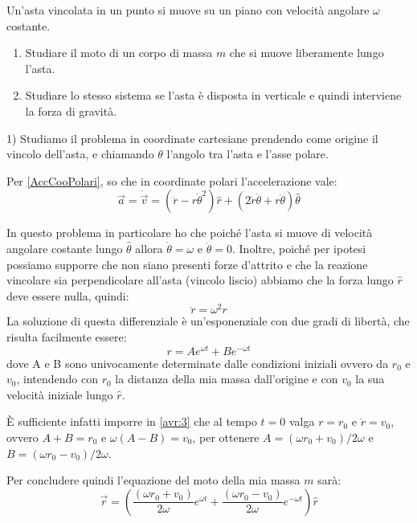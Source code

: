 \documentclass[../main.tex]{subfiles}
\begin{document}

\textex
Un'asta vincolata in un punto si muove su un piano con velocità angolare $\omega$ costante. 
\begin{enumerate}
	\item Studiare il moto di un corpo di massa $m$ che si muove liberamente lungo l'asta.
	\item Studiare lo stesso sistema se l'asta è disposta in verticale e quindi interviene la forza di gravità.
\end{enumerate}

\solution

1) Studiamo il problema in coordinate cartesiane prendendo come origine il vincolo dell'asta, e chiamando $\theta$ l'angolo tra l'asta e l'asse polare.

Per \cref{AccCooPolari}, so che in coordinate polari l'accelerazione vale: 
\begin{equation*}\label{avr:1}
	\overrightarrow{a}=\dot{\overrightarrow{v}} =(\ddot{r}-r\dot{\theta}^2)\hat{r}+(2\dot{r}\dot{\theta}+r\ddot{\theta})\hat{\theta}
\end{equation*}

In questo problema in particolare ho che poiché l'asta si muove di velocità angolare costante lungo  $\hat{\theta}$ allora
 $\dot{\theta}=\omega$ e $\ddot{\theta}=0$. Inoltre, poiché per ipotesi possiamo supporre che non siano presenti forze d'attrito e che la reazione vincolare sia 
 perpendicolare all'asta (vincolo liscio) abbiamo che la forza lungo $\hat{r}$ deve essere nulla, quindi:
 \begin{equation*}\label{avr:2}
  \ddot{r}=\omega^2r
 \end{equation*}
La soluzione di questa differenziale è un'esponenziale con due gradi di libertà, che risulta facilmente essere:
\begin{equation}\label{avr:3}
 r=Ae^{\omega t}+Be^{-\omega t}
\end{equation}
dove A e B sono univocamente determinate dalle condizioni iniziali ovvero da $r_0$ e $v_0$, intendendo con $r_0$ la distanza della mia massa dall'origine
e con $v_0$ la sua velocità iniziale lungo $\hat{r}$.

\`{E} sufficiente infatti imporre in \cref{avr:3} che al tempo $t=0$ valga $r=r_0$ e $\dot{r}=v_0$, ovvero $A+B=r_0$ e $\omega(A-B)=v_0$, per ottenere $A={(\omega r_0 +v_0)}/{2\omega}$ e $B={(\omega r_0 -v_0)}/{2\omega}$.

Per concludere quindi l'equazione del moto della mia massa $m$ sarà:
\begin{equation}
 \overrightarrow{r}=\left(\frac{(\omega r_0 +v_0)}{2\omega}e^{\omega t}+\frac{(\omega r_0 -v_0)}{2\omega}e^{-\omega t}\right)\hat{r}
\end{equation}
\end{document}
